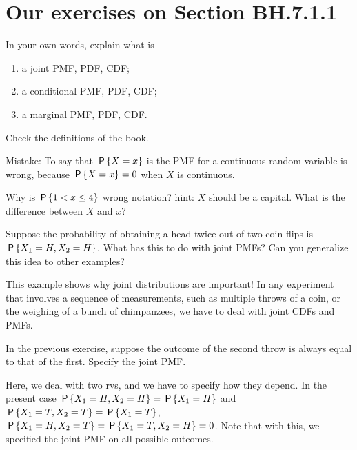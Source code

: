 

\section{Our exercises on Section BH.7.1.1}

\begin{exercise}
In your own words, explain what is
\begin{enumerate}
\item a joint PMF, PDF, CDF;
\item a conditional PMF, PDF, CDF;
\item a marginal PMF, PDF, CDF.
\end{enumerate}
\begin{solution}
Check the definitions of the book.

Mistake: To say that $\P{X=x}$ is the PMF for a continuous random variable is wrong, because $\P{X=x}=0$ when $X$ is continuous.

Why is $\P{1 < x \leq 4}$ wrong notation?
hint: $X$ should be a capital.
What is the difference between $X$ and $x$?

\end{solution}
\end{exercise}



\begin{exercise}
Suppose the probability of obtaining a head twice out of two coin flips is $\P{X_1=H, X_2=H}$.
What has this to do with joint PMFs? Can you generalize this idea to other examples?
\begin{solution}
This example shows why joint distributions are important!
In any experiment that involves a sequence of measurements, such as multiple throws of a coin, or the weighing of a bunch of chimpanzees, we have to deal with joint CDFs and PMFs.
\end{solution}
\end{exercise}


\begin{exercise}
In the previous exercise, suppose the outcome of the second throw is always equal to that of the first. Specify the joint PMF.
\begin{solution}
Here, we deal with two rvs, and we have to specify how they depend. In the present case $\P{X_1= H, X_2=H} = \P{X_1=H}$ and $\P{X_1= T, X_2=T} = \P{X_1=T}$, $\P{X_1= H, X_2=T} = \P{X_1= T, X_2=H} = 0$. Note that with this, we specified the joint PMF on all possible outcomes.
\end{solution}
\end{exercise}


